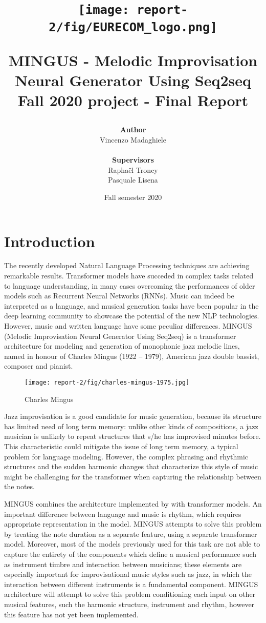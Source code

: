 \documentclass{article}
\title{
\vspace{12pt}
\texttt{[image: report-2/fig/EURECOM\_logo.png]}\par
\vspace{40pt}
{
\textbf{MINGUS - Melodic Improvisation \\ 
Neural Generator Using Seq2seq} \\ 
\vspace{5pt}
Fall 2020 project - Final Report} \par
}
\date{Fall semester 2020}
\author{\textbf{Author}\\
Vincenzo Madaghiele\\
\\
\textbf{Supervisors}\\
Raphaël Troncy \\
Pasquale Lisena }
\begin{document}
\maketitle

\newpage

\tableofcontents

\newpage

\section{Introduction} \label{sec:intro}
The recently developed Natural Language Processing techniques are achieving remarkable results. Transformer models have succeded in complex tasks related to language understanding, in many cases overcoming the performances of older models such as Recurrent Neural Networks (RNNs).
Music can indeed be interpreted as a language, and musical generation tasks have been popular in the deep learning community to showcase the potential of the new NLP technologies. However, music and written language have some peculiar differences. MINGUS (Melodic Improvisation Neural Generator Using Seq2seq) is a transformer architecture for modeling and generation of monophonic jazz melodic lines, named in honour of Charles Mingus (1922 – 1979), American jazz double bassist, composer and pianist. 

\begin{figure}[!ht]
    \centering
    \texttt{[image: report-2/fig/charles-mingus-1975.jpg]}
    \caption{Charles Mingus}
    \label{fig:mingus_photo}
\end{figure}

Jazz improvisation is a good candidate for music generation, because its structure has limited need of long term memory: unlike other kinds of compositions, a jazz musician is unlikely to repeat structures that s/he has improvised minutes before. This characteristic could mitigate the issue of long term memory, a typical problem for language modeling. However, the complex phrasing and rhythmic structures and the sudden harmonic changes that characterize this style of music might be challenging for the transformer when capturing the relationship between the notes. 

MINGUS combines the architecture implemented by \cite{ECMG} with transformer models. An important difference between language and music is rhythm, which requires appropriate representation in the model. MINGUS attempts to solve this problem by treating the note duration as a separate feature, using a separate transformer model. Moreover, most of the models previously used for this task are not able to capture the entirety of the components which define a musical performance such as instrument timbre and interaction between musicians; these elements are especially important for improvisational music styles such as jazz, in which the interaction between different instruments is a fundamental component. MINGUS architecture will attempt to solve this problem conditioning each input on other musical features, such the harmonic structure, instrument and rhythm, however this feature has not yet been implemented. 
\end{document}
